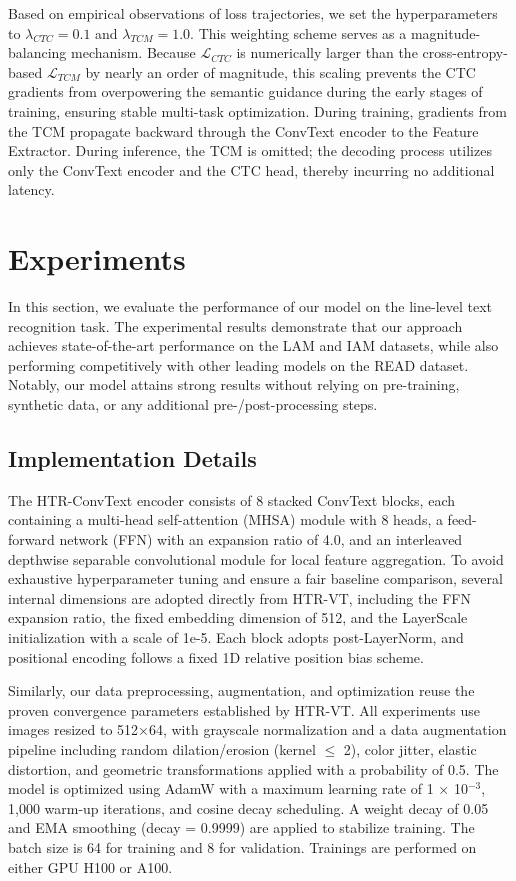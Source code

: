 \documentclass[final,5p,times]{elsarticle}
\begin{document}
Based on empirical observations of loss trajectories, we set the hyperparameters to $\lambda_{CTC} = 0.1$ and $\lambda_{TCM} = 1.0$. This weighting scheme serves as a magnitude-balancing mechanism. Because $\mathcal{L}_{CTC}$ is numerically larger than the cross-entropy-based $\mathcal{L}_{TCM}$ by nearly an order of magnitude, this scaling prevents the CTC gradients from overpowering the semantic guidance during the early stages of training, ensuring stable multi-task optimization. During training, gradients from the TCM propagate backward through the ConvText encoder to the Feature Extractor. During inference, the TCM is omitted; the decoding process utilizes only the ConvText encoder and the CTC head, thereby incurring no additional latency.

\section{Experiments}

In this section, we evaluate the performance of our model on the line-level text recognition task. The experimental results demonstrate that our approach achieves state-of-the-art performance on the LAM and IAM datasets, while also performing competitively with other leading models on the READ dataset. Notably, our model attains strong results without relying on pre-training, synthetic data, or any additional pre-/post-processing steps.

\subsection{Implementation Details}
The HTR-ConvText encoder consists of 8 stacked ConvText blocks, each containing a multi-head self-attention (MHSA) module with 8 heads, a feed-forward network (FFN) with an expansion ratio of 4.0, and an interleaved depthwise separable convolutional module for local feature aggregation. To avoid exhaustive hyperparameter tuning and ensure a fair baseline comparison, several internal dimensions are adopted directly from HTR-VT, including the FFN expansion ratio, the fixed embedding dimension of 512, and the LayerScale initialization with a scale of 1e-5. Each block adopts post-LayerNorm, and positional encoding follows a fixed 1D relative position bias scheme.

Similarly, our data preprocessing, augmentation, and optimization reuse the proven convergence parameters established by HTR-VT. All experiments use images resized to 512×64, with grayscale normalization and a data augmentation pipeline including random dilation/erosion (kernel $\leq$ 2), color jitter, elastic distortion, and geometric transformations applied with a probability of 0.5. The model is optimized using AdamW with a maximum learning rate of 1 × 10$^{-3}$, 1,000 warm-up iterations, and cosine decay scheduling. A weight decay of 0.05 and EMA smoothing (decay = 0.9999) are applied to stabilize training. The batch size is 64 for training and 8 for validation. Trainings are performed on either GPU H100 or A100.
\end{document}
